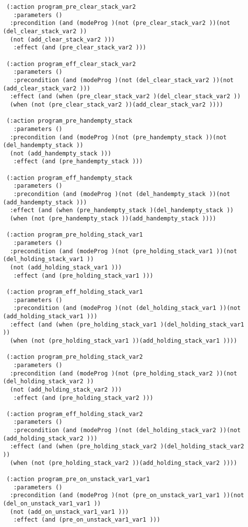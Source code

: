 \begin{scriptsize}
\begin{verbatim}
 (:action program_pre_clear_stack_var2
   :parameters ()
  :precondition (and (modeProg )(not (pre_clear_stack_var2 ))(not (del_clear_stack_var2 ))
  (not (add_clear_stack_var2 )))
   :effect (and (pre_clear_stack_var2 )))

 (:action program_eff_clear_stack_var2
   :parameters ()
   :precondition (and (modeProg )(not (del_clear_stack_var2 ))(not (add_clear_stack_var2 )))
  :effect (and (when (pre_clear_stack_var2 )(del_clear_stack_var2 ))
  (when (not (pre_clear_stack_var2 ))(add_clear_stack_var2 ))))

 (:action program_pre_handempty_stack
   :parameters ()
  :precondition (and (modeProg )(not (pre_handempty_stack ))(not (del_handempty_stack ))
  (not (add_handempty_stack )))
   :effect (and (pre_handempty_stack )))

 (:action program_eff_handempty_stack
   :parameters ()
   :precondition (and (modeProg )(not (del_handempty_stack ))(not (add_handempty_stack )))
  :effect (and (when (pre_handempty_stack )(del_handempty_stack ))
  (when (not (pre_handempty_stack ))(add_handempty_stack ))))

 (:action program_pre_holding_stack_var1
   :parameters ()
  :precondition (and (modeProg )(not (pre_holding_stack_var1 ))(not (del_holding_stack_var1 ))
  (not (add_holding_stack_var1 )))
   :effect (and (pre_holding_stack_var1 )))

 (:action program_eff_holding_stack_var1
   :parameters ()
   :precondition (and (modeProg )(not (del_holding_stack_var1 ))(not (add_holding_stack_var1 )))
  :effect (and (when (pre_holding_stack_var1 )(del_holding_stack_var1 ))
  (when (not (pre_holding_stack_var1 ))(add_holding_stack_var1 ))))

 (:action program_pre_holding_stack_var2
   :parameters ()
  :precondition (and (modeProg )(not (pre_holding_stack_var2 ))(not (del_holding_stack_var2 ))
  (not (add_holding_stack_var2 )))
   :effect (and (pre_holding_stack_var2 )))

 (:action program_eff_holding_stack_var2
   :parameters ()
   :precondition (and (modeProg )(not (del_holding_stack_var2 ))(not (add_holding_stack_var2 )))
  :effect (and (when (pre_holding_stack_var2 )(del_holding_stack_var2 ))
  (when (not (pre_holding_stack_var2 ))(add_holding_stack_var2 ))))

 (:action program_pre_on_unstack_var1_var1
   :parameters ()
  :precondition (and (modeProg )(not (pre_on_unstack_var1_var1 ))(not (del_on_unstack_var1_var1 ))
  (not (add_on_unstack_var1_var1 )))
   :effect (and (pre_on_unstack_var1_var1 )))


\end{verbatim}
\end{scriptsize}
